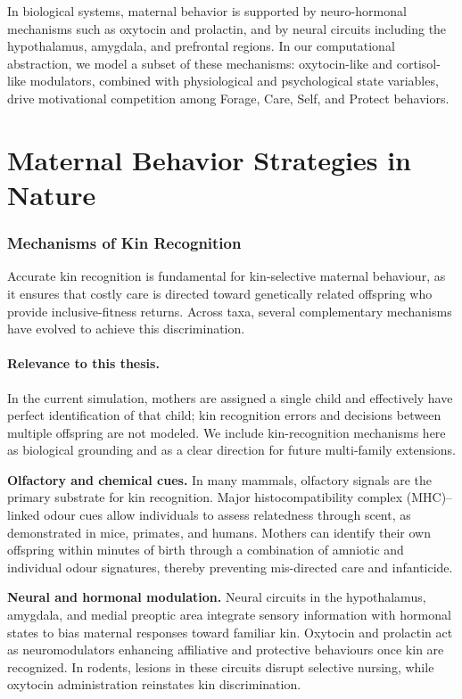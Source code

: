 In biological systems, maternal behavior is supported by neuro-hormonal mechanisms such as oxytocin and prolactin, and by neural circuits including the hypothalamus, amygdala, and prefrontal regions. In our computational abstraction, we model a subset of these mechanisms: oxytocin-like and cortisol-like modulators, combined with physiological and psychological state variables, drive motivational competition among Forage, Care, Self, and Protect behaviors.


\section{Maternal Behavior Strategies in Nature}
        
        \subsubsection{Mechanisms of Kin Recognition}
        Accurate kin recognition is fundamental for kin‐selective maternal behaviour, as it ensures that costly care is directed toward genetically related offspring who provide inclusive-fitness returns. Across taxa, several complementary mechanisms have evolved to achieve this discrimination.

        \paragraph{Relevance to this thesis.}
        In the current simulation, mothers are assigned a single child and effectively have perfect identification of that child; kin recognition errors and decisions between multiple offspring are not modeled. We include kin-recognition mechanisms here as biological grounding and as a clear direction for future multi-family extensions.

        \textbf{Olfactory and chemical cues.}  In many mammals, olfactory signals are the primary substrate for kin recognition.  Major histocompatibility complex (MHC)–linked odour cues allow individuals to assess relatedness through scent, as demonstrated in mice, primates, and humans.  Mothers can identify their own offspring within minutes of birth through a combination of amniotic and individual odour signatures, thereby preventing mis-directed care and infanticide.

        \textbf{Neural and hormonal modulation.}  Neural circuits in the hypothalamus, amygdala, and medial preoptic area integrate sensory information with hormonal states to bias maternal responses toward familiar kin.  Oxytocin and prolactin act as neuromodulators enhancing affiliative and protective behaviours once kin are recognized.  In rodents, lesions in these circuits disrupt selective nursing, while oxytocin administration reinstates kin discrimination.
        
